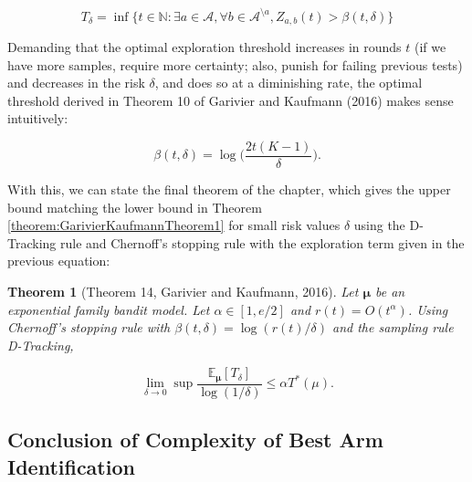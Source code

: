 \documentclass[11pt,]{article}
\newtheorem{theorem}{Theorem}
\begin{document}
\begin{equation*}
T_{\delta} = \inf \{t \in \mathbb{N}: \exists a \in \mathcal{A}, \forall b\in \mathcal{A}^{\setminus a}, Z_{a,b}(t) > \beta(t, \delta)\}
\end{equation*}

Demanding that the optimal exploration threshold increases in rounds
\(t\) (if we have more samples, require more certainty; also, punish for
failing previous tests) and decreases in the risk \(\delta\), and does
so at a diminishing rate, the optimal threshold derived in Theorem 10 of
Garivier and Kaufmann (2016) makes sense intuitively:

\begin{equation*}
\beta(t, \delta) = \log \Big(\frac{2t(K-1)}{\delta}\Big).
\end{equation*}

With this, we can state the final theorem of the chapter, which gives
the upper bound matching the lower bound in Theorem
\ref{theorem:GarivierKaufmannTheorem1} for small risk values \(\delta\)
using the D-Tracking rule and Chernoff's stopping rule with the
exploration term given in the previous equation:

\begin{theorem}[Theorem 14, Garivier and Kaufmann, 2016] \label{theorem:GarivierAndKaufmannTheorem14}
Let $\bm{\mu}$ be an exponential family bandit model. Let $\alpha \in [1, e/2]$ and $r(t) = O(t^{\alpha})$. Using Chernoff's stopping rule with $\beta(t,\delta) = \log(r(t)/\delta)$ and the sampling rule D-Tracking,

\begin{equation*}
\lim_{\delta \to 0} \sup \frac{\mathbb{E}_{\bm{\mu}}[T_{\delta}]}{\log(1/\delta)} \leq \alpha T^*(\mu).
\end{equation*}
\end{theorem}

\subsection{Conclusion of Complexity of Best Arm
Identification}\label{conclusion-of-complexity-of-best-arm-identification}
\end{document}
